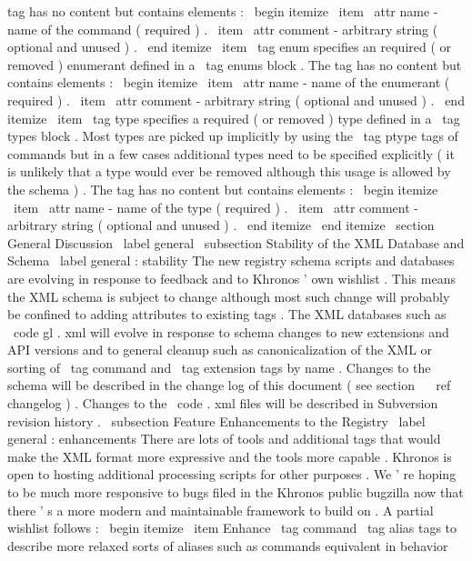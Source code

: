 tag
has
no
content
but
contains
elements
:
\
begin
{
itemize
}
\
item
\
attr
{
name
}
-
name
of
the
command
(
required
)
.
\
item
\
attr
{
comment
}
-
arbitrary
string
(
optional
and
unused
)
.
\
end
{
itemize
}
\
item
\
tag
{
enum
}
specifies
an
required
(
or
removed
)
enumerant
defined
in
a
\
tag
{
enums
}
block
.
The
tag
has
no
content
but
contains
elements
:
\
begin
{
itemize
}
\
item
\
attr
{
name
}
-
name
of
the
enumerant
(
required
)
.
\
item
\
attr
{
comment
}
-
arbitrary
string
(
optional
and
unused
)
.
\
end
{
itemize
}
\
item
\
tag
{
type
}
specifies
a
required
(
or
removed
)
type
defined
in
a
\
tag
{
types
}
block
.
Most
types
are
picked
up
implicitly
by
using
the
\
tag
{
ptype
}
tags
of
commands
but
in
a
few
cases
additional
types
need
to
be
specified
explicitly
(
it
is
unlikely
that
a
type
would
ever
be
removed
although
this
usage
is
allowed
by
the
schema
)
.
The
tag
has
no
content
but
contains
elements
:
\
begin
{
itemize
}
\
item
\
attr
{
name
}
-
name
of
the
type
(
required
)
.
\
item
\
attr
{
comment
}
-
arbitrary
string
(
optional
and
unused
)
.
\
end
{
itemize
}
\
end
{
itemize
}
\
section
{
General
Discussion
}
\
label
{
general
}
\
subsection
{
Stability
of
the
XML
Database
and
Schema
}
\
label
{
general
:
stability
}
The
new
registry
schema
scripts
and
databases
are
evolving
in
response
to
feedback
and
to
Khronos
'
own
wishlist
.
This
means
the
XML
schema
is
subject
to
change
although
most
such
change
will
probably
be
confined
to
adding
attributes
to
existing
tags
.
The
XML
databases
such
as
\
code
{
gl
.
xml
}
will
evolve
in
response
to
schema
changes
to
new
extensions
and
API
versions
and
to
general
cleanup
such
as
canonicalization
of
the
XML
or
sorting
of
\
tag
{
command
}
and
\
tag
{
extension
}
tags
by
name
.
Changes
to
the
schema
will
be
described
in
the
change
log
of
this
document
(
see
section
~
\
ref
{
changelog
}
)
.
Changes
to
the
\
code
{
.
xml
}
files
will
be
described
in
Subversion
revision
history
.
\
subsection
{
Feature
Enhancements
to
the
Registry
}
\
label
{
general
:
enhancements
}
There
are
lots
of
tools
and
additional
tags
that
would
make
the
XML
format
more
expressive
and
the
tools
more
capable
.
Khronos
is
open
to
hosting
additional
processing
scripts
for
other
purposes
.
We
'
re
hoping
to
be
much
more
responsive
to
bugs
filed
in
the
Khronos
public
bugzilla
now
that
there
'
s
a
more
modern
and
maintainable
framework
to
build
on
.
A
partial
wishlist
follows
:
\
begin
{
itemize
}
\
item
Enhance
\
tag
{
command
}
\
tag
{
alias
}
tags
to
describe
more
relaxed
sorts
of
aliases
such
as
commands
equivalent
in
behavior
